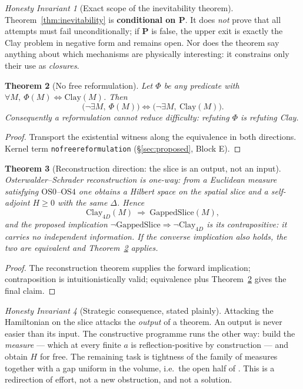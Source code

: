 \documentclass[11pt,a4paper]{article}
\theoremstyle{plain}
\newtheorem{theorem}{Theorem}[section]
\theoremstyle{definition}
\theoremstyle{remark}
\newtheorem{invariant}[theorem]{Honesty Invariant}
\newcommand{\OS}{\mathrm{OS}}\newcommand{\Gap}{\mathrm{Gap}}
\renewcommand{\_}{\oldunderscore\allowbreak}
\newcommand{\Lean}[1]{\texttt{\small #1}}
\begin{document}
\begin{invariant}[Exact scope of the inevitability theorem]\label{inv:inevitability}
Theorem~\ref{thm:inevitability} is \textbf{conditional on \textbf{P}}. It does \emph{not} prove
that all attempts must fail unconditionally; if \textbf{P} is false, the upper exit is exactly
the Clay problem in negative form and remains open. Nor does the theorem say anything about
which mechanisms are physically interesting: it constrains only their use as \emph{closures}.
\end{invariant}
\begin{theorem}[No free reformulation]\label{thm:nofree}
Let $\Phi$ be any predicate with $\forall M,\ \Phi(M)\iff\mathrm{Clay}(M)$. Then
\[
\big(\neg\exists M,\ \Phi(M)\big)\iff\big(\neg\exists M,\ \mathrm{Clay}(M)\big).
\]
Consequently a reformulation cannot reduce difficulty: refuting $\Phi$ is refuting Clay.
\end{theorem}
\begin{proof}
Transport the existential witness along the equivalence in both directions. Kernel term
\Lean{no\_free\_reformulation} (\S\ref{sec:proposed}, Block E).
\end{proof}
\begin{theorem}[Reconstruction direction: the slice is an output, not an input]
\label{thm:reconstruction}
Osterwalder--Schrader reconstruction is one-way: from a Euclidean measure satisfying
$\OS0$--$\OS4$ one obtains a Hilbert space on the spatial slice and a self-adjoint $H\ge0$ with
the same $\Delta$. Hence
\[
\mathrm{Clay}_{4D}(M)\ \Longrightarrow\ \mathrm{GappedSlice}(M),
\]
and the proposed implication
$\neg\mathrm{GappedSlice}\Rightarrow\neg\mathrm{Clay}_{4D}$ is its contrapositive: it carries no
independent information. If the converse implication also holds, the two are equivalent and
Theorem~\ref{thm:nofree} applies.
\end{theorem}
\begin{proof}
The reconstruction theorem supplies the forward implication; contraposition is intuitionistically
valid; equivalence plus Theorem~\ref{thm:nofree} gives the final claim.
\end{proof}
\begin{invariant}[Strategic consequence, stated plainly]\label{inv:strategy}
Attacking the Hamiltonian on the slice attacks the \emph{output} of a theorem. An output is never
easier than its input. The constructive programme runs the other way: build the \emph{measure}
--- which at every finite $a$ is reflection-positive by construction --- and obtain $H$ for
free. The remaining task is tightness of the family of measures together with a gap uniform in
the volume, i.e.\ the open half of \cite{JaffeWitten2000}. This is a redirection of effort, not a
new obstruction, and not a solution.
\end{invariant}
\end{document}
